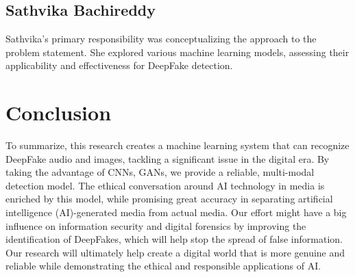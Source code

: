 \documentclass[12pt]{extarticle}
\begin{document}
\subsection{Sathvika Bachireddy}
Sathvika's primary responsibility was conceptualizing the approach to the problem statement. She explored various machine learning models, assessing their applicability and effectiveness for DeepFake detection.


\section{Conclusion}

⁤To summarize, this research creates a machine learning system that can recognize DeepFake audio and images, tackling a significant issue in the digital era. ⁤⁤By taking the advantage of CNNs, GANs, we provide a reliable, multi-modal detection model. ⁤⁤The ethical conversation around AI technology in media is enriched by this model, while promising great accuracy in separating artificial intelligence (AI)-generated media from actual media. ⁤Our effort might have a big influence on information security and digital forensics by improving the identification of DeepFakes, which will help stop the spread of false information. Our research will ultimately help create a digital world that is more genuine and reliable while demonstrating the ethical and responsible applications of AI. 




\end{document}
